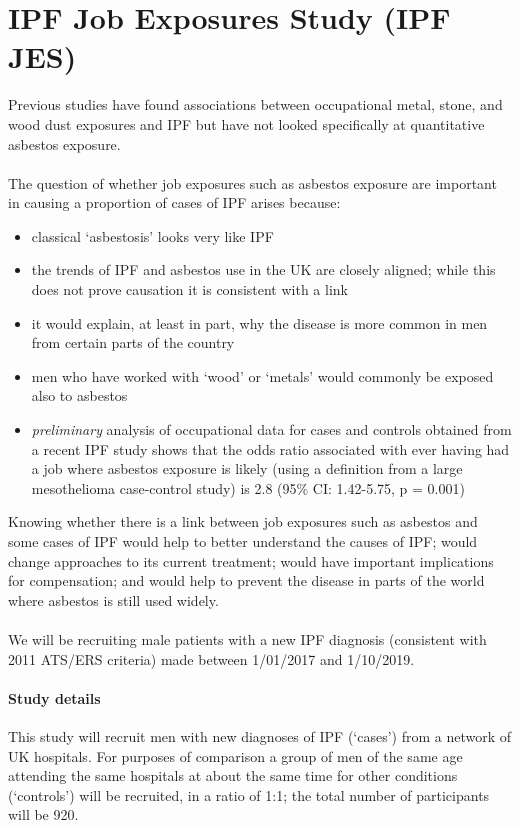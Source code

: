 \documentclass[a4paper,10pt]{article}
\author{Carl Reynolds \\
\small National Heart \& Lung Institute, Imperial College London }
\begin{document}
\section*{\centering IPF Job Exposures Study (IPF JES)}

Previous studies have found associations between occupational metal, stone, and wood dust exposures and IPF but have not looked specifically at quantitative asbestos exposure. \\ \\ The question of whether job exposures such as asbestos exposure are important in causing a proportion of cases of IPF arises because:
\begin{itemize}
 \item classical ‘asbestosis’ looks very like IPF
 \item the trends of IPF and asbestos use in the UK are closely aligned; while this does not prove causation it is consistent with a link
 \item it would explain, at least in part, why the disease is more common in men from certain parts of the country
 \item men who have worked with ‘wood’ or ‘metals’ would commonly be exposed also to asbestos
 \item \textit{preliminary} analysis of occupational data for cases and controls obtained from a recent IPF study shows that the odds ratio associated with ever having had a job where asbestos exposure is likely (using a definition from a large mesothelioma case-control study) is 2.8 (95\% CI: 1.42-5.75, p = 0.001)
\end{itemize}

Knowing whether there is a link between job exposures such as asbestos and some cases of IPF would help to better understand the causes of IPF; would change approaches to its current treatment; would have important implications for compensation; and would help to prevent the disease in parts of the world where asbestos is still used widely. \\ \\ We will be recruiting male patients with a new IPF diagnosis (consistent with 2011 ATS/ERS criteria) made between 1/01/2017 and 1/10/2019. 

\paragraph{Study details}
This study will recruit men with new diagnoses of IPF (‘cases’) from a network of UK hospitals. For purposes of comparison a group of men of the same age attending the same hospitals at about the same time for other conditions (‘controls’) will be recruited, in a ratio of 1:1; the total number of participants will be 920. 
\end{document}
